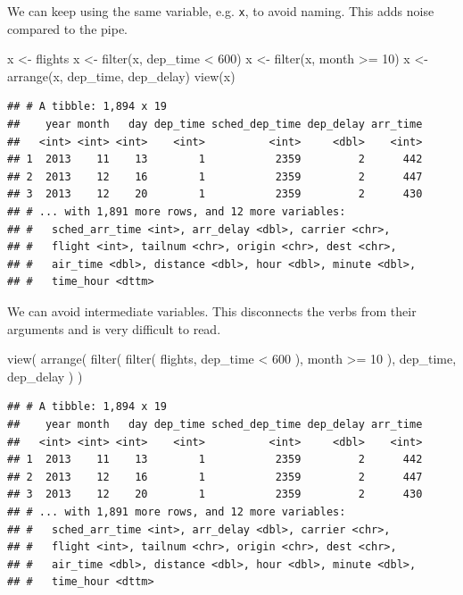 \documentclass[]{book}
\newenvironment{Shaded}{}{}
\newcommand{\DecValTok}[1]{#1}
\newcommand{\KeywordTok}[1]{\textcolor[rgb]{0.00,0.00,1.00}{#1}}
\newcommand{\NormalTok}[1]{#1}
\newcommand{\OperatorTok}[1]{#1}
\newcommand{\StringTok}[1]{\textcolor[rgb]{0.00,0.50,0.50}{#1}}
\begin{document}
We can keep using the same variable, e.g. \texttt{x}, to avoid naming.
This adds noise compared to the pipe.

\begin{Shaded}
\begin{Highlighting}[]
\NormalTok{x <-}\StringTok{ }\NormalTok{flights}
\NormalTok{x <-}\StringTok{ }\KeywordTok{filter}\NormalTok{(x, dep_time }\OperatorTok{<}\StringTok{ }\DecValTok{600}\NormalTok{)}
\NormalTok{x <-}\StringTok{ }\KeywordTok{filter}\NormalTok{(x, month }\OperatorTok{>=}\StringTok{ }\DecValTok{10}\NormalTok{)}
\NormalTok{x <-}\StringTok{ }\KeywordTok{arrange}\NormalTok{(x, dep_time, dep_delay)}
\KeywordTok{view}\NormalTok{(x)}
\end{Highlighting}
\end{Shaded}

\begin{verbatim}
## # A tibble: 1,894 x 19
##    year month   day dep_time sched_dep_time dep_delay arr_time
##   <int> <int> <int>    <int>          <int>     <dbl>    <int>
## 1  2013    11    13        1           2359         2      442
## 2  2013    12    16        1           2359         2      447
## 3  2013    12    20        1           2359         2      430
## # ... with 1,891 more rows, and 12 more variables:
## #   sched_arr_time <int>, arr_delay <dbl>, carrier <chr>,
## #   flight <int>, tailnum <chr>, origin <chr>, dest <chr>,
## #   air_time <dbl>, distance <dbl>, hour <dbl>, minute <dbl>,
## #   time_hour <dttm>
\end{verbatim}

We can avoid intermediate variables.
This disconnects the verbs from their arguments and is very difficult to read.

\begin{Shaded}
\begin{Highlighting}[]
\KeywordTok{view}\NormalTok{(}
  \KeywordTok{arrange}\NormalTok{(}
    \KeywordTok{filter}\NormalTok{(}
      \KeywordTok{filter}\NormalTok{(}
\NormalTok{        flights,}
\NormalTok{        dep_time }\OperatorTok{<}\StringTok{ }\DecValTok{600}
\NormalTok{      ),}
\NormalTok{      month }\OperatorTok{>=}\StringTok{ }\DecValTok{10}
\NormalTok{    ),}
\NormalTok{    dep_time, dep_delay}
\NormalTok{  )}
\NormalTok{)}
\end{Highlighting}
\end{Shaded}

\begin{verbatim}
## # A tibble: 1,894 x 19
##    year month   day dep_time sched_dep_time dep_delay arr_time
##   <int> <int> <int>    <int>          <int>     <dbl>    <int>
## 1  2013    11    13        1           2359         2      442
## 2  2013    12    16        1           2359         2      447
## 3  2013    12    20        1           2359         2      430
## # ... with 1,891 more rows, and 12 more variables:
## #   sched_arr_time <int>, arr_delay <dbl>, carrier <chr>,
## #   flight <int>, tailnum <chr>, origin <chr>, dest <chr>,
## #   air_time <dbl>, distance <dbl>, hour <dbl>, minute <dbl>,
## #   time_hour <dttm>
\end{verbatim}
\end{document}
